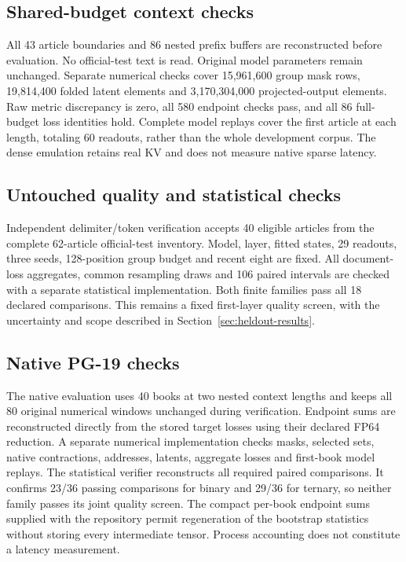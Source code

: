 \documentclass[11pt]{article}
\begin{document}
\subsection{Shared-budget context checks}
\label{app:shared-development}

All 43 article boundaries and 86 nested prefix buffers are reconstructed
before evaluation. No official-test text is read. Original model parameters
remain unchanged. Separate numerical checks cover 15,961,600 group mask
rows, 19,814,400 folded latent elements and 3,170,304,000 projected-output
elements. Raw metric discrepancy is zero, all 580 endpoint checks pass,
and all 86 full-budget loss identities hold. Complete model replays cover
the first article at each length, totaling 60 readouts, rather than the
whole development corpus. The dense emulation retains real KV and does
not measure native sparse latency.

\subsection{Untouched quality and statistical checks}
\label{app:heldout-record}

Independent delimiter/token verification accepts 40 eligible articles from
the complete 62-article official-test inventory. Model, layer, fitted states,
29 readouts, three seeds, 128-position group budget and recent eight are
fixed. All document-loss aggregates, common resampling draws and 106 paired
intervals are checked with a separate statistical implementation. Both
finite families pass all 18 declared comparisons. This remains a fixed
first-layer quality screen, with the uncertainty and scope described in
Section~\ref{sec:heldout-results}.

\subsection{Native PG-19 checks}
\label{app:native-pg19}

The native evaluation uses 40 books at two nested context lengths and keeps
all 80 original numerical windows unchanged during verification.
Endpoint sums are reconstructed directly from the stored target losses
using their declared FP64 reduction. A separate numerical implementation
checks masks, selected sets, native contractions, addresses, latents,
aggregate losses and first-book model replays. The statistical verifier
reconstructs all required paired comparisons. It confirms 23/36 passing
comparisons for binary and 29/36 for ternary, so neither family passes
its joint quality screen. The compact per-book endpoint sums supplied
with the repository permit regeneration of the bootstrap statistics
without storing every intermediate tensor. Process accounting does not
constitute a latency measurement.
\end{document}
